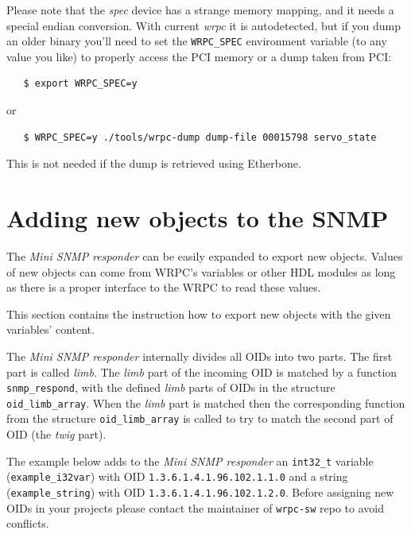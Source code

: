 \documentclass[a4paper, 12pt]{article}
\begin{document}
Please note that the \textit{spec} device has a strange memory mapping, and
it needs a special endian conversion. With current \textit{wrpc} it is
autodetected, but if you dump an older binary you'll need to set the
\texttt{WRPC\_SPEC} environment variable (to any value you like) to properly
access the PCI memory or a dump taken from PCI:
\begin{lstlisting}
   $ export WRPC_SPEC=y
\end{lstlisting}
or
\begin{lstlisting}
   $ WRPC_SPEC=y ./tools/wrpc-dump dump-file 00015798 servo_state
\end{lstlisting}
This is not needed if the dump is retrieved using Etherbone.

\newpage
\section{Adding new objects to the SNMP}
\label{Adding new objects to the SNMP}

The \textit{Mini SNMP responder} can be easily expanded to export new objects.
Values of new objects can come from WRPC's variables or other HDL modules
as long as there is a proper interface to the WRPC to read these values.

This section contains the instruction how to export new objects with
the given variables' content.

The \textit{Mini SNMP responder} internally divides all OIDs into two parts.
The first part is called \textit{limb}. The \textit{limb} part of the incoming OID is
matched by a function \texttt{snmp\_respond}, with the defined \textit{limb} parts of OIDs
in the structure \texttt{oid\_limb\_array}.
When the \textit{limb} part is matched then the corresponding function from
the structure \texttt{oid\_limb\_array} is called to try to match the second part of
OID (the \textit{twig} part).

\begin{sloppypar} %
The example below adds to the \textit{Mini SNMP responder} an \texttt{int32\_t} variable
(\texttt{example\_i32var}) with OID \texttt{1.3.6.1.4.1.96.102.1.1.0} and a string
(\texttt{example\_string}) with OID \texttt{1.3.6.1.4.1.96.102.1.2.0}.
Before assigning new OIDs in your projects please contact the maintainer of
\texttt{wrpc-sw} repo to avoid conflicts.
\end{sloppypar}
\end{document}
